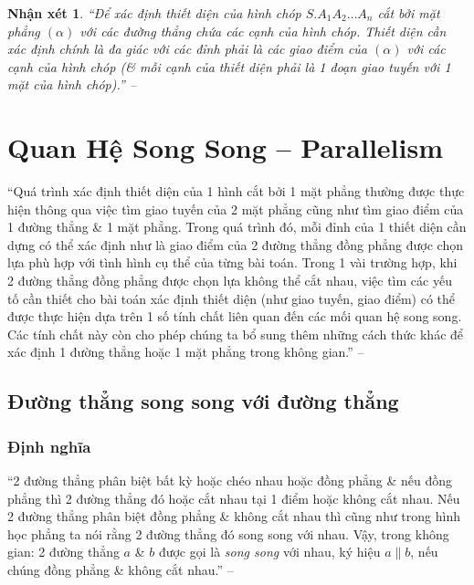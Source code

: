 \documentclass[oneside]{book}
\numberwithin{equation}{section}
\newtheorem{nhanxet}{Nhận xét}[section]
\begin{document}
\begin{nhanxet}
	``Để xác định thiết diện của hình chóp $S.A_1A_2\ldots A_n$ cắt bởi mặt phẳng $(\alpha)$ với các đường thẳng chứa các cạnh của hình chóp. Thiết diện cần xác định chính là đa giác với các đỉnh phải là các giao điểm của $(\alpha)$ với các cạnh của hình chóp (\& mỗi cạnh của thiết diện phải là 1 đoạn giao tuyến với 1 mặt của hình chóp).'' -- \cite[p. 55]{TL_chuyen_Toan_Hinh_Hoc_11}
\end{nhanxet}


\section{Quan Hệ Song Song -- Parallelism}
``Quá trình xác định thiết diện của 1 hình cắt bởi 1 mặt phẳng thường được thực hiện thông qua việc tìm giao tuyến của 2 mặt phẳng cũng như tìm giao điểm của 1 đường thẳng \& 1 mặt phẳng. Trong quá trình đó, mỗi đỉnh của 1 thiết diện cần dựng có thể xác định như là giao điểm của 2 đường thẳng đồng phẳng được chọn lựa phù hợp với tình hình cụ thể của từng bài toán. Trong 1 vài trường hợp, khi 2 đường thẳng đồng phẳng được chọn lựa không thể cắt nhau, việc tìm các yếu tố cần thiết cho bài toán xác định thiết diện (như giao tuyến, giao điểm) có thể được thực hiện dựa trên 1 số tính chất liên quan đến các mối quan hệ song song. Các tính chất này còn cho phép chúng ta bổ sung thêm những cách thức khác để xác định 1 đường thẳng hoặc 1 mặt phẳng trong không gian.'' -- \cite[p. 59]{TL_chuyen_Toan_Hinh_Hoc_11}

\subsection{Đường thẳng song song với đường thẳng}

\subsubsection{Định nghĩa}
``2 đường thẳng phân biệt bất kỳ hoặc chéo nhau hoặc đồng phẳng \& nếu đồng phẳng thì 2 đường thẳng đó hoặc cắt nhau tại 1 điểm hoặc không cắt nhau. Nếu 2 đường thẳng phân biệt đồng phẳng \& không cắt nhau thì cũng như trong hình học phẳng ta nói rằng 2 đường thẳng đó song song với nhau. Vậy, trong không gian: 2 đường thẳng $a$ \& $b$ được gọi là \textit{song song} với nhau, ký hiệu $a\parallel b$, nếu chúng đồng phẳng \& không cắt nhau.'' -- \cite[pp. 59--60]{TL_chuyen_Toan_Hinh_Hoc_11}
\end{document}
